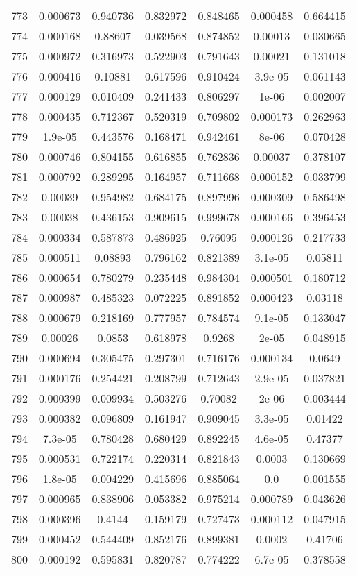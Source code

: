 \begin{table}
\begin{tabular}{c|c|c|c|c|c|c}
773 & 0.000673 & 0.940736 & 0.832972 & 0.848465 & 0.000458 & 0.664415\\
774 & 0.000168 & 0.88607 & 0.039568 & 0.874852 & 0.00013 & 0.030665\\
775 & 0.000972 & 0.316973 & 0.522903 & 0.791643 & 0.00021 & 0.131018\\
776 & 0.000416 & 0.10881 & 0.617596 & 0.910424 & 3.9e-05 & 0.061143\\
777 & 0.000129 & 0.010409 & 0.241433 & 0.806297 & 1e-06 & 0.002007\\
778 & 0.000435 & 0.712367 & 0.520319 & 0.709802 & 0.000173 & 0.262963\\
779 & 1.9e-05 & 0.443576 & 0.168471 & 0.942461 & 8e-06 & 0.070428\\
780 & 0.000746 & 0.804155 & 0.616855 & 0.762836 & 0.00037 & 0.378107\\
781 & 0.000792 & 0.289295 & 0.164957 & 0.711668 & 0.000152 & 0.033799\\
782 & 0.00039 & 0.954982 & 0.684175 & 0.897996 & 0.000309 & 0.586498\\
783 & 0.00038 & 0.436153 & 0.909615 & 0.999678 & 0.000166 & 0.396453\\
784 & 0.000334 & 0.587873 & 0.486925 & 0.76095 & 0.000126 & 0.217733\\
785 & 0.000511 & 0.08893 & 0.796162 & 0.821389 & 3.1e-05 & 0.05811\\
786 & 0.000654 & 0.780279 & 0.235448 & 0.984304 & 0.000501 & 0.180712\\
787 & 0.000987 & 0.485323 & 0.072225 & 0.891852 & 0.000423 & 0.03118\\
788 & 0.000679 & 0.218169 & 0.777957 & 0.784574 & 9.1e-05 & 0.133047\\
789 & 0.00026 & 0.0853 & 0.618978 & 0.9268 & 2e-05 & 0.048915\\
790 & 0.000694 & 0.305475 & 0.297301 & 0.716176 & 0.000134 & 0.0649\\
791 & 0.000176 & 0.254421 & 0.208799 & 0.712643 & 2.9e-05 & 0.037821\\
792 & 0.000399 & 0.009934 & 0.503276 & 0.70082 & 2e-06 & 0.003444\\
793 & 0.000382 & 0.096809 & 0.161947 & 0.909045 & 3.3e-05 & 0.01422\\
794 & 7.3e-05 & 0.780428 & 0.680429 & 0.892245 & 4.6e-05 & 0.47377\\
795 & 0.000531 & 0.722174 & 0.220314 & 0.821843 & 0.0003 & 0.130669\\
796 & 1.8e-05 & 0.004229 & 0.415696 & 0.885064 & 0.0 & 0.001555\\
797 & 0.000965 & 0.838906 & 0.053382 & 0.975214 & 0.000789 & 0.043626\\
798 & 0.000396 & 0.4144 & 0.159179 & 0.727473 & 0.000112 & 0.047915\\
799 & 0.000452 & 0.544409 & 0.852176 & 0.899381 & 0.0002 & 0.41706\\
800 & 0.000192 & 0.595831 & 0.820787 & 0.774222 & 6.7e-05 & 0.378558\\
\end{tabular}
\end{table}
